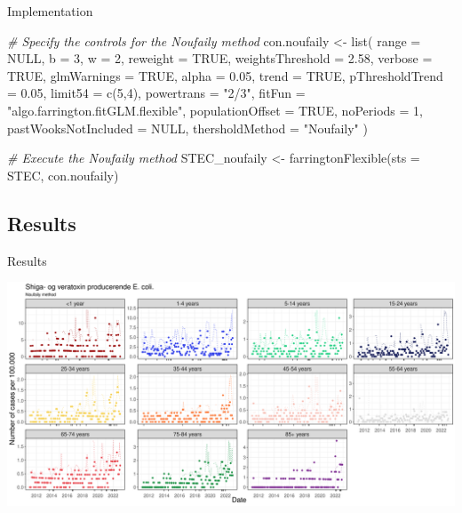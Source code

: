 \documentclass[aspectratio=169]{beamer}
\newenvironment{Shaded}{\begin{snugshade}}{\end{snugshade}}
\newcommand{\AttributeTok}[1]{\textcolor[rgb]{0.77,0.63,0.00}{#1}}
\newcommand{\CommentTok}[1]{\textcolor[rgb]{0.56,0.35,0.01}{\textit{#1}}}
\newcommand{\ConstantTok}[1]{\textcolor[rgb]{0.00,0.00,0.00}{#1}}
\newcommand{\DecValTok}[1]{\textcolor[rgb]{0.00,0.00,0.81}{#1}}
\newcommand{\FloatTok}[1]{\textcolor[rgb]{0.00,0.00,0.81}{#1}}
\newcommand{\FunctionTok}[1]{\textcolor[rgb]{0.00,0.00,0.00}{#1}}
\newcommand{\NormalTok}[1]{#1}
\newcommand{\OtherTok}[1]{\textcolor[rgb]{0.56,0.35,0.01}{#1}}
\newcommand{\StringTok}[1]{\textcolor[rgb]{0.31,0.60,0.02}{#1}}
\begin{document}
\begin{frame}[fragile]{Implementation}
\tiny

\begin{Shaded}
\begin{Highlighting}[]
\CommentTok{\# Specify the controls for the Noufaily method}
\NormalTok{con.noufaily }\OtherTok{\textless{}{-}} \FunctionTok{list}\NormalTok{(}
  \AttributeTok{range =} \ConstantTok{NULL}\NormalTok{, }\AttributeTok{b =} \DecValTok{3}\NormalTok{, }\AttributeTok{w =} \DecValTok{2}\NormalTok{,}
  \AttributeTok{reweight =} \ConstantTok{TRUE}\NormalTok{, }\AttributeTok{weightsThreshold =} \FloatTok{2.58}\NormalTok{,}
  \AttributeTok{verbose =} \ConstantTok{TRUE}\NormalTok{, }\AttributeTok{glmWarnings =} \ConstantTok{TRUE}\NormalTok{,}
  \AttributeTok{alpha =} \FloatTok{0.05}\NormalTok{, }\AttributeTok{trend =} \ConstantTok{TRUE}\NormalTok{, }\AttributeTok{pThresholdTrend =} \FloatTok{0.05}\NormalTok{,}
  \AttributeTok{limit54 =} \FunctionTok{c}\NormalTok{(}\DecValTok{5}\NormalTok{,}\DecValTok{4}\NormalTok{), }\AttributeTok{powertrans =} \StringTok{"2/3"}\NormalTok{,}
  \AttributeTok{fitFun =} \StringTok{"algo.farrington.fitGLM.flexible"}\NormalTok{,}
  \AttributeTok{populationOffset =} \ConstantTok{TRUE}\NormalTok{,}
  \AttributeTok{noPeriods =} \DecValTok{1}\NormalTok{, }\AttributeTok{pastWooksNotIncluded =} \ConstantTok{NULL}\NormalTok{,}
  \AttributeTok{thersholdMethod =} \StringTok{"Noufaily"}
\NormalTok{)}

\CommentTok{\# Execute the Noufaily method}
\NormalTok{STEC\_noufaily }\OtherTok{\textless{}{-}} \FunctionTok{farringtonFlexible}\NormalTok{(}\AttributeTok{sts =}\NormalTok{ STEC, con.noufaily)}
\end{Highlighting}
\end{Shaded}

\normalsize
\end{frame}

\hypertarget{results-1}{%
\subsection{Results}\label{results-1}}

\begin{frame}{Results}
\tiny

\includegraphics[width=1\linewidth]{../figures/STEC_noufaily}

\normalsize
\end{frame}
\end{document}
